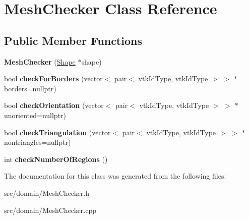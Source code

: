 \hypertarget{class_mesh_checker}{}\section{Mesh\+Checker Class Reference}
\label{class_mesh_checker}
\subsection*{Public Member Functions}
\begin{DoxyCompactItemize}
\item 
\hypertarget{class_mesh_checker_a9952333587b195bfa117aa4003218043}{}{\bfseries Mesh\+Checker} (\hyperlink{class_shape}{Shape} $\ast$shape)\label{class_mesh_checker_a9952333587b195bfa117aa4003218043}

\item 
\hypertarget{class_mesh_checker_ae24c4e3f5feff68c83726fb23d97585f}{}bool {\bfseries check\+For\+Borders} (vector$<$ pair$<$ vtk\+Id\+Type, vtk\+Id\+Type $>$ $>$ $\ast$borders=nullptr)\label{class_mesh_checker_ae24c4e3f5feff68c83726fb23d97585f}

\item 
\hypertarget{class_mesh_checker_af43afc7f2b3882664f0ee2391c147efb}{}bool {\bfseries check\+Orientation} (vector$<$ pair$<$ vtk\+Id\+Type, vtk\+Id\+Type $>$ $>$ $\ast$unoriented=nullptr)\label{class_mesh_checker_af43afc7f2b3882664f0ee2391c147efb}

\item 
\hypertarget{class_mesh_checker_a98cde65ece5f709e4ef3657cb8129fa4}{}bool {\bfseries check\+Triangulation} (vector$<$ pair$<$ vtk\+Id\+Type, vtk\+Id\+Type $>$ $>$ $\ast$nontriangles=nullptr)\label{class_mesh_checker_a98cde65ece5f709e4ef3657cb8129fa4}

\item 
\hypertarget{class_mesh_checker_a95c42fdfb234e0be1d70ba255dbb5703}{}int {\bfseries check\+Number\+Of\+Regions} ()\label{class_mesh_checker_a95c42fdfb234e0be1d70ba255dbb5703}

\end{DoxyCompactItemize}


The documentation for this class was generated from the following files\+:\begin{DoxyCompactItemize}
\item 
src/domain/Mesh\+Checker.\+h\item 
src/domain/Mesh\+Checker.\+cpp\end{DoxyCompactItemize}
